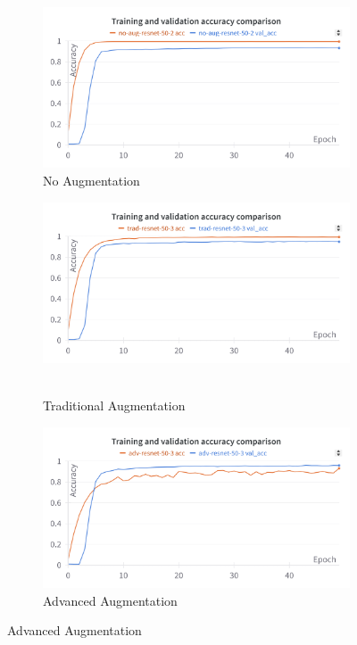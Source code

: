 \begin{figure}[!h]
    \centering
    \begin{subfigure}{0.75\textwidth}
        \centering
        \includegraphics[width=\textwidth]{Images/flowers-results/LC-Train-Val-No-Aug.png}
        \caption{No Augmentation}
    \end{subfigure}
    \vspace{0.3cm}

    \begin{subfigure}{0.75\textwidth}
        \centering
        \includegraphics[width=\textwidth]{Images/flowers-results/LC-Train-Val-Trad-Aug.png}\
        \caption{Traditional Augmentation}
    \end{subfigure}
    \vspace{0.3cm}

    \begin{subfigure}{0.75\textwidth}
        \centering
        \includegraphics[width=\textwidth]{Images/flowers-results/LC-Train-Val-Adv-Aug.png}
        \caption{Advanced Augmentation}
    \end{subfigure}
    \vspace{0.3cm}


\end{figure}

